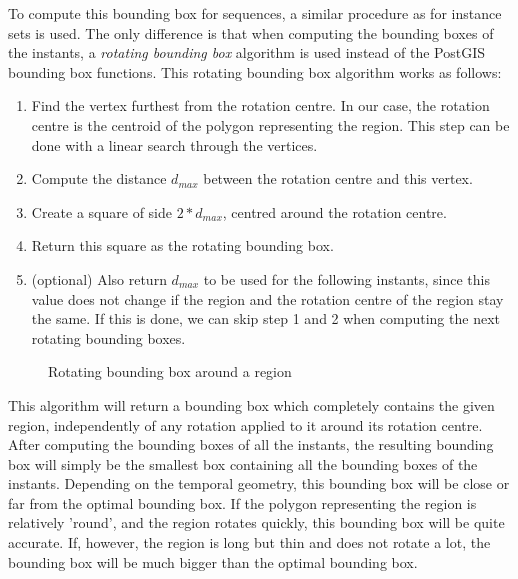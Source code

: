 To compute this bounding box for sequences, a similar procedure as for instance sets is used. The only difference is that when computing the bounding boxes of the instants, a \textit{rotating bounding box} algorithm is used instead of the PostGIS bounding box functions. This rotating bounding box algorithm works as follows:

\begin{enumerate}
    \item Find the vertex furthest from the rotation centre. In our case, the rotation centre is the centroid of the polygon representing the region. This step can be done with a linear search through the vertices.
    \item Compute the distance $d_{max}$ between the rotation centre and this vertex.
    \item Create a square of side $2*d_{max}$, centred around the rotation centre.
    \item Return this square as the rotating bounding box.
    \item (optional) Also return $d_{max}$ to be used for the following instants, since this value does not change if the region and the rotation centre of the region stay the same. If this is done, we can skip step 1 and 2 when computing the next rotating bounding boxes.
\end{enumerate}

\begin{figure}[h!]
    \centering
    \caption{Rotating bounding box around a region}
    \label{fig:rotating_bbox}
\end{figure}

This algorithm will return a bounding box which completely contains the given region, independently of any rotation applied to it around its rotation centre. After computing the bounding boxes of all the instants, the resulting bounding box will simply be the smallest box containing all the bounding boxes of the instants. Depending on the temporal geometry, this bounding box will be close or far from the optimal bounding box. If the polygon representing the region is relatively 'round', and the region rotates quickly, this bounding box will be quite accurate. If, however, the region is long but thin and does not rotate a lot, the bounding box will be much bigger than the optimal bounding box.

